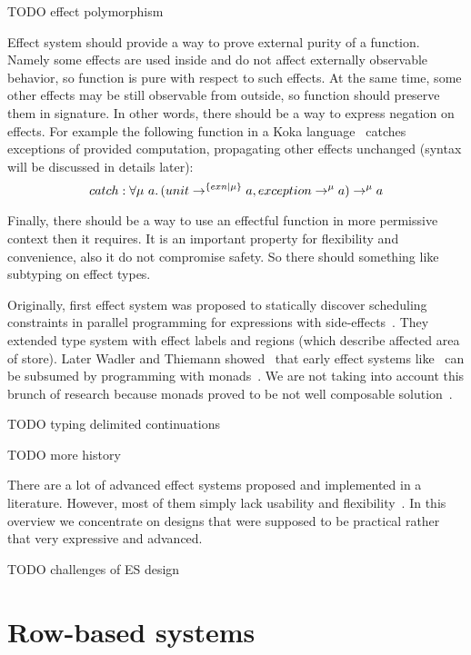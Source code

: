 \documentclass[conference]{IEEEtran}
\newcommand{\ap}{~}
\begin{document}
    TODO effect polymorphism %

    Effect system should provide a way to prove external purity of a function.
    Namely some effects are used inside and do not affect externally observable behavior, so function is pure with respect to such effects.
    At the same time, some other effects may be still observable from outside, so function should preserve them in signature.
    In other words, there should be a way to express negation on effects.
    For example the following function in a Koka language~\cite{koka} catches exceptions of provided computation, propagating other effects unchanged (syntax will be discussed in details later):
    \[catch : \forall \mu\ap a\ldotp (unit\to^{\{exn|\mu\}} a, exception \to^{\mu} a) \to^\mu a\]

    Finally, there should be a way to use an effectful function in more permissive context then it requires.
    It is an important property for flexibility and convenience, also it do not compromise safety.
    So there should something like subtyping on effect types.

    Originally, first effect system was proposed to statically discover scheduling constraints in parallel programming for expressions with side-effects~\cite{first-effect-system}.
    They extended type system with effect labels and regions (which describe affected area of store).
    Later Wadler and Thiemann showed~\cite{marriage} that early effect systems like~\cite{first-effect-system} can be subsumed by programming with monads~\cite{monads}.
    We are not taking into account this brunch of research because monads proved to be not well composable solution~\cite{transformers, extensible-effects}.

    TODO typing delimited continuations %

    TODO more history %

    There are a lot of advanced effect systems proposed and implemented in a literature.
    However, most of them simply lack usability and flexibility~\cite{scoped-capabilities}.
    In this overview we concentrate on designs that were supposed to be practical rather that very expressive and advanced.

    TODO challenges of ES design %


    \section{Row-based systems}
\end{document}

